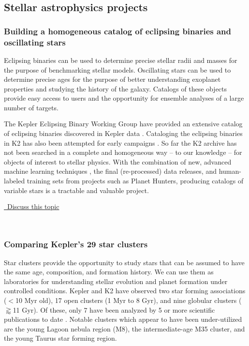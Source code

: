 \documentclass[modern]{aastex62}
\newcommand{\commentlink}[1]{\href{https://github.com/KeplerGO/ScientificOpportunities/issues/#1}{\sc \faExternalLink\ Discuss this topic}\,\,}
\begin{document}
\subsection{Stellar astrophysics projects}

\subsubsection{Building a homogeneous catalog of eclipsing binaries and oscillating stars}

Eclipsing binaries can be used to determine precise stellar radii and masses for the purpose of benchmarking stellar models. Oscillating stars can be used to determine precise ages for the purpose of better understanding exoplanet properties and studying the history of the galaxy. Catalogs of these objects provide easy access to users and the opportunity for ensemble analyses of a large number of targets.

The Kepler Eclipsing Binary Working Group have provided an extensive catalog of eclipsing binaries discovered in Kepler data \citep[e.g.][]{ebs1, ebs2}. Cataloging the eclipsing binaries in K2 has also been attempted for early campaigns \citep[e.g.][]{lacourse2015,barros2016,maxted2018,bayliss2018}. So far the K2 archive has not been searched in a complete and homogeneous way -- to our knowledge -- for objects of interest to stellar physics. With the combination of new, advanced machine learning techniques \citep[e.g. Self-Organizing Maps;][]{armstrong2016}, the final (re-processed) data releases, and human-labeled training sets from projects such as Planet Hunters, producing catalogs of variable stars is a tractable and valuable project.
\\
\begin{center}
\commentlink{12}
\end{center}
\ \\

\subsubsection{Comparing Kepler's 29 star clusters}
Star clusters provide the opportunity to study stars that can be assumed to have the same age, composition, and formation history. We can use them as laboratories for understanding stellar evolution and planet formation under controlled conditions. 
Kepler and K2 have observed two star forming associations ($<$10 Myr old), 17 open clusters (1 Myr to 8 Gyr), and nine globular clusters ($\gtrapprox$11 Gyr). Of these, only 7 have been analyzed by 5 or more scientific publications to date \citep[see][for an overview]{cody2018b}. Notable clusters which appear to have been under-utilized are the young Lagoon nebula region (M8), the intermediate-age M35 cluster, and the young Taurus star forming region. 
\end{document}
